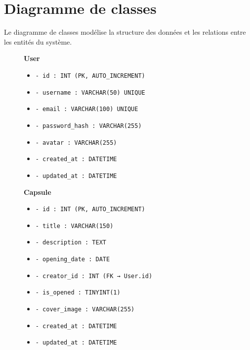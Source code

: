 \documentclass[12pt,a4paper]{report}
\begin{document}
\section{Diagramme de classes}

Le diagramme de classes modélise la structure des données et les relations entre les entités du système.

\begin{figure}[H]
    \centering
    \begin{tcolorbox}[colback=codebg, colframe=codeframe, width=\textwidth, title={\textbf{Diagramme de classes — ChronoVault}}]
        \small
        \textbf{User}
        \begin{itemize}[noitemsep, leftmargin=1.5em]
            \item \texttt{- id : INT (PK, AUTO\_INCREMENT)}
            \item \texttt{- username : VARCHAR(50) UNIQUE}
            \item \texttt{- email : VARCHAR(100) UNIQUE}
            \item \texttt{- password\_hash : VARCHAR(255)}
            \item \texttt{- avatar : VARCHAR(255)}
            \item \texttt{- created\_at : DATETIME}
            \item \texttt{- updated\_at : DATETIME}
        \end{itemize}

        \vspace{0.4cm}
        \textbf{Capsule}
        \begin{itemize}[noitemsep, leftmargin=1.5em]
            \item \texttt{- id : INT (PK, AUTO\_INCREMENT)}
            \item \texttt{- title : VARCHAR(150)}
            \item \texttt{- description : TEXT}
            \item \texttt{- opening\_date : DATE}
            \item \texttt{- creator\_id : INT (FK → User.id)}
            \item \texttt{- is\_opened : TINYINT(1)}
            \item \texttt{- cover\_image : VARCHAR(255)}
            \item \texttt{- created\_at : DATETIME}
            \item \texttt{- updated\_at : DATETIME}
        \end{itemize}


\end{tcolorbox}
\end{figure}
\end{document}
